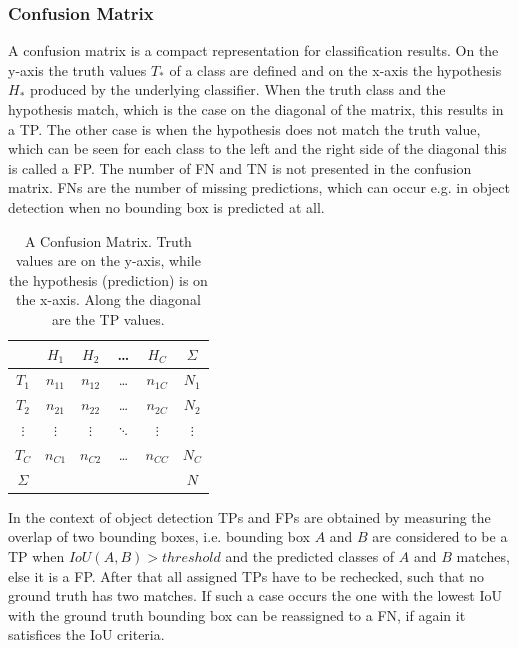 \subsubsection{Confusion Matrix}

A confusion matrix is a compact representation for classification results.
On the y-axis the truth values $T_*$ of a class are defined and on the x-axis the hypothesis $H_*$ produced by the underlying classifier.
When the truth class and the hypothesis match, which is the case on the diagonal of the matrix, this results in a \ac{TP}.
The other case is when the hypothesis does not match the truth value, which can be seen for each class to the left and the right side of the diagonal this is called a \ac{FP}.
The number of \ac{FN} and \ac{TN} is not presented in the confusion matrix.
\acp{FN} are the number of missing predictions, which can occur e.g. in object detection when no bounding box is predicted at all.

\begin{table}
\begin{center}
\begin{tabular}{c | c c c c | c}
    & \textbf{$H_1$} & \textbf{$H_2$} & \textbf{\ldots} & \textbf{$H_C$} & {$\Sigma$} \\
    \hline
    $T_1$ & \cellcolor{green}$n_{11}$ & $n_{12}$ & \ldots & $n_{1C}$ & $N_1$\\
    $T_2$ & $n_{21}$ & \cellcolor{green}$n_{22}$ & \ldots & $n_{2C}$ & $N_2$\\
    \textbf{$\vdots$} & $\vdots$ & $\vdots$ & \cellcolor{green}$\ddots$ & $\vdots$ & \textbf{$\vdots$} \\
    $T_C$ & $n_{C1}$ & $n_{C2}$ & \ldots &\cellcolor{green} $n_{CC}$ & $N_C$\\
    \hline
    $\Sigma$  & & & & & $N$\\
\end{tabular}
\caption{A Confusion Matrix. Truth values are on the y-axis, while the hypothesis (prediction) is on the x-axis. Along the diagonal are the \ac{TP} values.}
\label{tab:confmat}
\end{center}
\end{table}

In the context of object detection \acp{TP} and \acp{FP} are obtained by measuring the overlap of two bounding boxes, i.e. bounding box $A$ and $B$ are considered to be a \ac{TP} when $IoU(A, B) > threshold$ and the predicted classes of $A$ and $B$ matches, else it is a \ac{FP}.
After that all assigned \acp{TP} have to be rechecked, such that no ground truth has two matches.
If such a case occurs the one with the lowest \ac{IoU} with the ground truth bounding box can be reassigned to a \ac{FN}, if again it satisfices the \ac{IoU} criteria.


